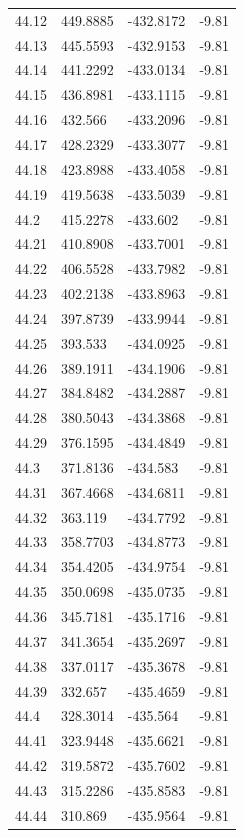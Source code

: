 \begin{table}[H]
\begin{tabular}{llll}
44.12 & 449.8885 & -432.8172 & -9.81 \\
44.13 & 445.5593 & -432.9153 & -9.81 \\
44.14 & 441.2292 & -433.0134 & -9.81 \\
44.15 & 436.8981 & -433.1115 & -9.81 \\
44.16 & 432.566 & -433.2096 & -9.81 \\
44.17 & 428.2329 & -433.3077 & -9.81 \\
44.18 & 423.8988 & -433.4058 & -9.81 \\
44.19 & 419.5638 & -433.5039 & -9.81 \\
44.2 & 415.2278 & -433.602 & -9.81 \\
44.21 & 410.8908 & -433.7001 & -9.81 \\
44.22 & 406.5528 & -433.7982 & -9.81 \\
44.23 & 402.2138 & -433.8963 & -9.81 \\
44.24 & 397.8739 & -433.9944 & -9.81 \\
44.25 & 393.533 & -434.0925 & -9.81 \\
44.26 & 389.1911 & -434.1906 & -9.81 \\
44.27 & 384.8482 & -434.2887 & -9.81 \\
44.28 & 380.5043 & -434.3868 & -9.81 \\
44.29 & 376.1595 & -434.4849 & -9.81 \\
44.3 & 371.8136 & -434.583 & -9.81 \\
44.31 & 367.4668 & -434.6811 & -9.81 \\
44.32 & 363.119 & -434.7792 & -9.81 \\
44.33 & 358.7703 & -434.8773 & -9.81 \\
44.34 & 354.4205 & -434.9754 & -9.81 \\
44.35 & 350.0698 & -435.0735 & -9.81 \\
44.36 & 345.7181 & -435.1716 & -9.81 \\
44.37 & 341.3654 & -435.2697 & -9.81 \\
44.38 & 337.0117 & -435.3678 & -9.81 \\
44.39 & 332.657 & -435.4659 & -9.81 \\
44.4 & 328.3014 & -435.564 & -9.81 \\
44.41 & 323.9448 & -435.6621 & -9.81 \\
44.42 & 319.5872 & -435.7602 & -9.81 \\
44.43 & 315.2286 & -435.8583 & -9.81 \\
44.44 & 310.869 & -435.9564 & -9.81 \\

\end{tabular}
\end{table}
